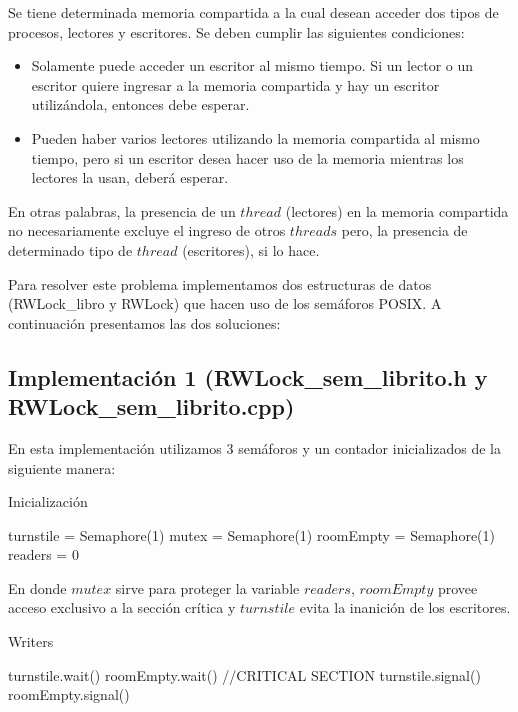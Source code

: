 Se tiene determinada memoria compartida a la cual desean acceder dos tipos de procesos, lectores y escritores. Se deben cumplir las siguientes condiciones:
\begin{itemize}
	\item Solamente puede acceder un escritor al mismo tiempo. Si un lector o un escritor quiere ingresar a la memoria compartida y hay un escritor utilizándola, entonces debe esperar.
	\item Pueden haber varios lectores utilizando la memoria compartida al mismo tiempo, pero si un escritor desea hacer uso de la memoria mientras los lectores la usan, deberá esperar.
\end{itemize}

En otras palabras, la presencia de un $thread$ (lectores) en la memoria compartida no necesariamente excluye el ingreso de otros $threads$ pero, la presencia de determinado tipo de $thread$ (escritores), si lo hace.

Para resolver este problema implementamos dos estructuras de datos (RWLock\_libro y RWLock) que hacen uso de los semáforos POSIX. A continuación presentamos las dos soluciones:

\subsection{Implementación 1 (RWLock\_sem\_librito.h y RWLock\_sem\_librito.cpp)} 

En esta implementación utilizamos 3 semáforos y un contador inicializados de la siguiente manera:

\begin{algorithm}[H]
\caption{Inicialización}\label{ej1}
\begin{algorithmic}[1]
	\State turnstile = Semaphore(1)
	\State mutex = Semaphore(1)
	\State roomEmpty = Semaphore(1)
	\State readers = 0
\EndProcedure
\end{algorithmic}
\end{algorithm}

En donde $mutex$ sirve para proteger la variable $readers$, $roomEmpty$ provee acceso exclusivo a la sección crítica y $turnstile$ evita la inanición de los escritores.

\begin{algorithm}[H]
\caption{Writers}\label{ej1}
\begin{algorithmic}[1]
	\State turnstile.wait()
	\State roomEmpty.wait()
	\State //CRITICAL SECTION
	\State turnstile.signal()
	\State roomEmpty.signal()
\EndProcedure
\end{algorithmic}
\end{algorithm}

